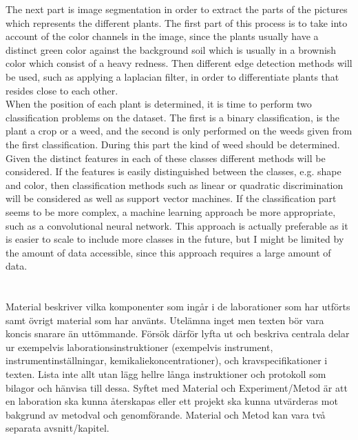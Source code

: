 The next part is image segmentation in order to extract the parts of the pictures which represents the different plants. The first part of this process is to take into account of the color channels in the image, since the plants usually have a distinct green color against the background soil which is usually in a brownish color which consist of a heavy redness. Then different edge detection methods will be used, such as applying a laplacian filter, in order to differentiate plants that resides close to each other.\\

When the position of each plant is determined, it is time to perform two classification problems on the dataset. The first is a binary classification, is the plant a crop or a weed, and the second is only performed on the weeds given from the first classification. During this part the kind of weed should be determined. Given the distinct features in each of these classes different methods will be considered. If the features is easily distinguished between the classes, e.g. shape and color, then classification methods such as linear or quadratic discrimination will be considered as well as support vector machines. If the classification part seems to be more complex, a machine learning approach be more appropriate, such as a convolutional neural network. This approach is actually preferable as it is easier to scale to include more classes in the future, but I might be limited by the amount of data accessible, since this approach requires a large amount of data.\\

\section{}
Material beskriver vilka komponenter som ingår i de
laborationer som har utförts samt övrigt material som har
använts. Utelämna inget men texten bör vara koncis snarare än
uttömmande. Försök därför lyfta ut och beskriva centrala delar
ur exempelvis laborationsinstruktioner (exempelvis instrument,
instrumentinställningar, kemikaliekoncentrationer), och
kravspecifikationer i texten. Lista inte allt utan lägg hellre långa
instruktioner och protokoll som bilagor och hänvisa till dessa.
Syftet med Material och Experiment/Metod är att en laboration
ska kunna återskapas eller ett projekt ska kunna utvärderas mot
bakgrund av metodval och genomförande.
Material och Metod kan vara två separata avsnitt/kapitel. 